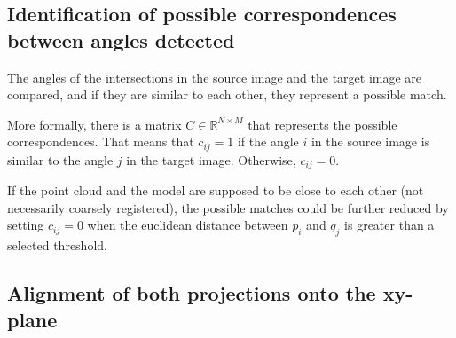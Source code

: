         \subsection{Identification of possible correspondences between angles detected}
        \label{sub:Identification of possible correspondences between angles detected}
            The angles of the intersections in the source image and the target image are compared,
            and if they are similar to each other, they represent a possible match.

            More formally, there is a matrix $C \in \mathbb{R}^{N \times M}$ that represents the possible correspondences.
            That means that $c_{ij} = 1$ if the angle $i$ in the source image is similar to the angle $j$ in the target image.
            Otherwise, $c_{ij} = 0$.

            If the point cloud and the model are supposed to be close to each other (not necessarily coarsely registered),
            the possible matches could be further reduced by setting $c_{ij} = 0$ when the euclidean distance between $p_i$
            and $q_j$ is greater than a selected threshold.

        \subsection{Alignment of both projections onto the xy-plane}
            \label{sub:Alignment of both projections onto the xy-plane}

